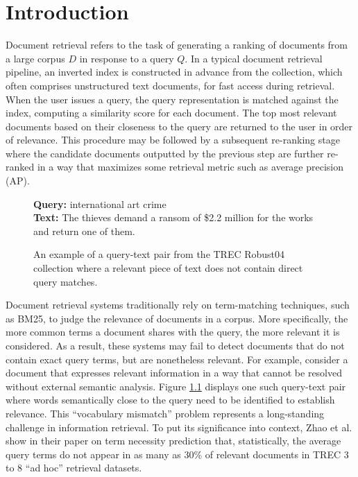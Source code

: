 \chapter{Introduction}

Document retrieval refers to the task of generating a ranking of documents from a large corpus $ D $ in response to a query $ Q $.
In a typical document retrieval pipeline, an inverted index is constructed in advance from the collection, which often comprises unstructured text documents, for fast access during retrieval.
When the user issues a query, the query representation is matched against the index, computing a similarity score for each document.
The top most relevant documents based on their closeness to the query are returned to the user in order of relevance.
This procedure may be followed by a subsequent re-ranking stage where the candidate documents outputted by the previous step are further re-ranked in a way that maximizes some retrieval metric such as average precision (AP).

\begin{figure}[b!]
	\begin{framed}
		\centering
    		\textbf{Query:} international art crime \\
    		\textbf{Text:} The thieves demand a ransom of \$2.2 million for the works and return one of them.
	\end{framed}
\label{query-sent-example}
 \caption{An example of a query-text pair from the TREC Robust04 collection where a relevant piece of text does not contain direct query matches.}
\end{figure}

Document retrieval systems traditionally rely on term-matching techniques, such as BM25, to judge the relevance of documents in a corpus.
More specifically, the more common terms a document shares with the query, the more relevant it is considered.
As a result, these systems may fail to detect documents that do not contain exact query terms, but are nonetheless relevant.
For example, consider a document that expresses relevant information in a way that cannot be resolved without external semantic analysis.
Figure \ref{query-sent-example} displays one such query-text pair where words semantically close to the query need to be identified to establish relevance.
This ``vocabulary mismatch'' problem represents a long-standing challenge in information retrieval.
To put its significance into context, Zhao et al. \cite{zhao2010term} show in their paper on term necessity prediction that, statistically, the average query terms do not appear in as many as 30\% of relevant documents in TREC 3 to 8 ``ad hoc'' retrieval datasets.

